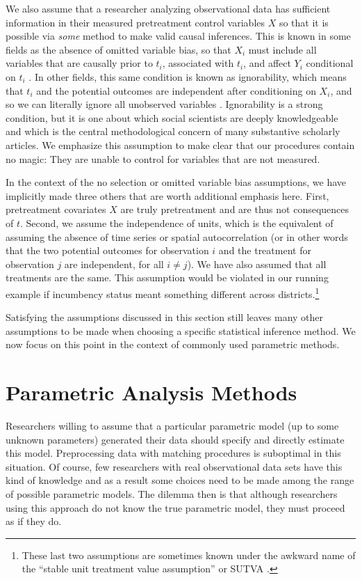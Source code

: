 \documentclass[11pt,titlepage]{article}
\begin{document}
We also assume that a researcher analyzing observational data has
sufficient information in their measured pretreatment control
variables $X$ so that it is possible via \emph{some} method to make
valid causal inferences.  This is known in some fields as the absence
of omitted variable bias, so that $X_i$ must include all variables
that are causally prior to $t_i$, associated with $t_i$, and affect
$Y_i$ conditional on $t_i$ \citep{Goldberger91,KinKeoVer94}.  In other
fields, this same condition is known as ignorability, which means that
$t_i$ and the potential outcomes are independent after conditioning on
$X_i$, and so we can literally ignore all unobserved variables
\citep{RosRub83}.  Ignorability is a strong condition, but it is one
about which social scientists are deeply knowledgeable and which is
the central methodological concern of many substantive scholarly
articles.  We emphasize this assumption to make clear that our
procedures contain no magic: They are unable to control for variables
that are not measured.

In the context of the no selection or omitted variable bias
assumptions, we have implicitly made three others that are worth
additional emphasis here.  First, pretreatment covariates $X$ are
truly pretreatment and are thus not consequences of $t$.  Second, we
assume the independence of units, which is the equivalent of assuming
the absence of time series or spatial autocorrelation (or in other
words that the two potential outcomes for observation $i$ and the
treatment for observation $j$ are independent, for all $i\not=j$).  We
have also assumed that all treatments are the same.  This assumption
would be violated in our running example if incumbency status meant
something different across districts.\footnote{These last two
  assumptions are sometimes known under the awkward name of the
  ``stable unit treatment value assumption'' or SUTVA
  \citep{Rubin74}.}

Satisfying the assumptions discussed in this section still leaves many
other assumptions to be made when choosing a specific statistical
inference method.  We now focus on this point in the context of
commonly used parametric methods.

\section{Parametric Analysis Methods}

Researchers willing to assume that a particular parametric model (up
to some unknown parameters) generated their data should specify and
directly estimate this model.  Preprocessing data with matching
procedures is suboptimal in this situation.  Of course, few
researchers with real observational data sets have this kind of
knowledge and as a result some choices need to be made among the range
of possible parametric models.  The dilemma then is that although
researchers using this approach do not know the true parametric model,
they must proceed as if they do.
\end{document}
